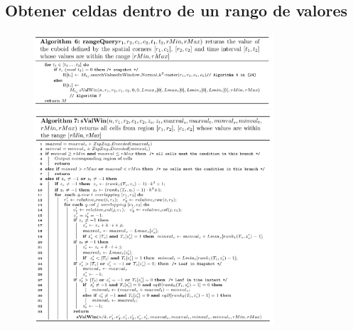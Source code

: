 \documentclass{article}
\begin{document}
\subsection*{Obtener celdas dentro de un rango de valores}
\begin{figure}[h]
  \centering
  \includegraphics[width=0.8\textwidth]{../images/al6.png}
  \includegraphics[width=0.8\textwidth]{../images/al7.png}
\end{figure}
\end{document}
